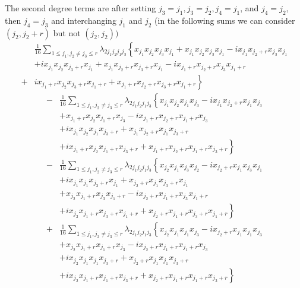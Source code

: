 \documentclass[aps, preprint]{revtex4}
\begin{document}
The second degree terms are after setting $j_{3} =j_{1} ,j_{3} =j_{2} ,j_{4} =j_{1}\text{,}$ and $j_{4} =j_{2}\text{,}$ then $j_{4} =j_{3}$ and interchanging $j_{1}$ and $j_{2}$ (in the following sums we can consider $\left (j_{2} ,j_{2} +r\right )$ but not $\left (j_{2} ,j_{2}\right ))$
\begin{align*} & \frac{1}{16} \sum _{1 \leq j_{1} ,j_{2} \neq j_{3} \leq r}\lambda _{2 j_{1} j_{2} j_{1} j_{3}}\left \{x_{j_{1}} x_{j_{2}} x_{j_{3}} x_{j_{1}} +x_{j_{1}} x_{j_{2}} x_{j_{3}} x_{j_{1}} -i x_{j_{1}} x_{j_{2} +r} x_{j_{3}} x_{j_{1}}\right . \\
 &  +i x_{j_{1}} x_{j_{2}} x_{j_{3} +r} x_{j_{1}} +x_{j_{1}} x_{j_{2} +r} x_{j_{3} +r} x_{j_{1}} -i x_{j_{1} +r} x_{j_{2} +r} x_{j_{3}} x_{j_{1} +r} \\
 + & \left .i x_{j_{1} +r} x_{j_{2}} x_{j_{3} +r} x_{j_{1} +r} +x_{j_{1} +r} x_{j_{2} +r} x_{j_{3} +r} x_{j_{1} +r}\right \}\end{align*}
\begin{align*} - & \frac{1}{16} \sum _{1 \leq j_{1} ,j_{2} \neq j_{3} \leq r}\lambda _{2 j_{1} j_{2} j_{1} j_{3}}\left \{x_{j_{1}} x_{j_{2}} x_{j_{1}} x_{j_{3}} -i x_{j_{1}} x_{j_{2} +r} x_{j_{1}} x_{j_{3}}\right . \\
 &  +x_{j_{1} +r} x_{j_{2}} x_{j_{1} +r} x_{j_{3}} -i x_{j_{1} +r} x_{j_{2} +r} x_{j_{1} +r} x_{j_{3}} \\
 &  +i x_{j_{1}} x_{j_{2}} x_{j_{1}} x_{j_{3} +r} +x_{j_{1}} x_{j_{2} +r} x_{j_{1}} x_{j_{3} +r} \\
 &  +\left .i x_{j_{1} +r} x_{j_{2}} x_{j_{1} +r} x_{j_{3} +r} +x_{j_{1} +r} x_{j_{2} +r} x_{j_{1} +r} x_{j_{3} +r}\right \}\end{align*}
\begin{align*} - & \frac{1}{16} \sum _{1 \leq j_{1} ,j_{2} \neq j_{3} \leq r}\lambda _{2 j_{1} j_{2} j_{1} j_{3}}\left \{x_{j_{2}} x_{j_{1}} x_{j_{3}} x_{j_{2}} -i x_{j_{2} +r} x_{j_{1}} x_{j_{3}} x_{j_{1}}\right . \\
 &  +i x_{j_{1}} x_{j_{1}} x_{j_{3} +r} x_{j_{1}} +x_{j_{2} +r} x_{j_{1}} x_{j_{3} +r} x_{j_{1}} \\
 &  +x_{j_{2}} x_{j_{1} +r} x_{j_{3}} x_{j_{1} +r} -i x_{j_{2} +r} x_{j_{1} +r} x_{j_{3}} x_{j_{1} +r} \\
 &  +\left .i x_{j_{2}} x_{j_{1} +r} x_{j_{3} +r} x_{j_{1} +r} +x_{j_{2} +r} x_{j_{1} +r} x_{j_{3} +r} x_{j_{1} +r}\right \}\end{align*}
\begin{align*} + & \frac{1}{16} \sum _{1 \leq j_{1} ,j_{2} \neq j_{3} \leq r}\lambda _{2 j_{1} j_{2} j_{1} j_{3}}\left \{x_{j_{2}} x_{j_{1}} x_{j_{1}} x_{j_{3}} -i x_{j_{2} +r} x_{j_{1}} x_{j_{1}} x_{j_{3}}\right . \\
 &  +x_{j_{2}} x_{j_{1} +r} x_{j_{1} +r} x_{j_{3}} -i x_{j_{2} +r} x_{j_{1} +r} x_{j_{1} +r} x_{j_{3}} \\
 &  +i x_{j_{2}} x_{j_{1}} x_{j_{1}} x_{j_{3} +r} +x_{j_{2} +r} x_{j_{1}} x_{j_{1}} x_{j_{3} +r} \\
 &  +\left .i x_{j_{2}} x_{j_{1} +r} x_{j_{1} +r} x_{j_{3} +r} +x_{j_{2} +r} x_{j_{1} +r} x_{j_{1} +r} x_{j_{3} +r}\right \}\end{align*}
\end{document}
